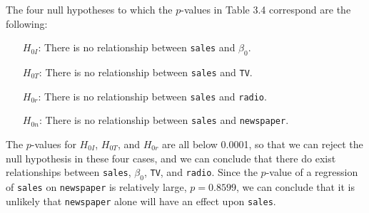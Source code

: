 
The four null hypotheses to which the $p$-values in Table 3.4 correspond are the following:
\begin{itemize}
    \item[$H_{0I}$:]
        There is no relationship between \verb|sales| and $\beta_0$.
    \item[$H_{0T}$:]
        There is no relationship between \verb|sales| and \verb|TV|.
    \item[$H_{0r}$:]
        There is no relationship between \verb|sales| and \verb|radio|.
    \item[$H_{0n}$:]
        There is no relationship between \verb|sales| and \verb|newspaper|.
\end{itemize}
The $p$-values for $H_{0I}$, $H_{0T}$, and $H_{0r}$ are all below 0.0001, so that we can 
reject the null hypothesis in these four cases, and we can conclude that there do exist
relationships between \verb|sales|, $\beta_0$, \verb|TV|, and \verb|radio|. Since the
$p$-value of a regression of \verb|sales| on \verb|newspaper| is relatively large, 
$p = 0.8599$, we can conclude that it is unlikely that \verb|newspaper| alone will have
an effect upon \verb|sales|.

